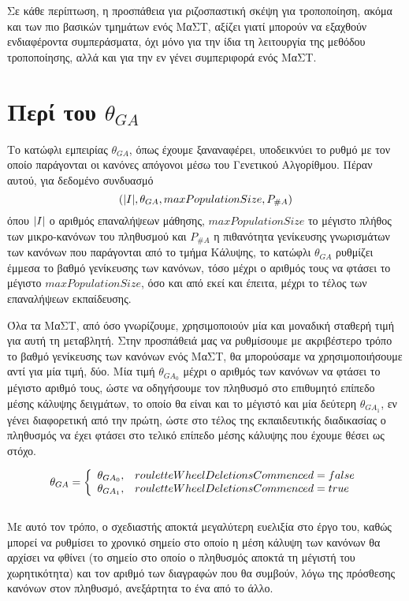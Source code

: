 Σε κάθε περίπτωση, η προσπάθεια για ριζοσπαστική σκέψη για τροποποίηση, ακόμα και των πιο βασικών τμημάτων ενός ΜαΣΤ, αξίζει γιατί μπορούν να εξαχθούν ενδιαφέροντα συμπεράσματα, όχι μόνο για την ίδια τη λειτουργία της μεθόδου τροποποίησης, αλλά και για την εν γένει συμπεριφορά ενός ΜαΣΤ.


\section{Περί του $\theta_{GA}$}
Το κατώφλι εμπειρίας $\theta_{GA}$, όπως έχουμε ξαναναφέρει, υποδεικνύει το ρυθμό με τον οποίο παράγονται οι κανόνες απόγονοι μέσω του Γενετικού Αλγορίθμου. Πέραν αυτού, για δεδομένο συνδυασμό $$(\lvert I\rvert, \theta_{GA}, maxPopulationSize, P_{\#A})$$ όπου $\lvert I\rvert$ ο αριθμός επαναλήψεων μάθησης, $maxPopulationSize$ το μέγιστο πλήθος των μικρο-κανόνων του πληθυσμού και $P_{\#A}$ η πιθανότητα γενίκευσης γνωρισμάτων των κανόνων που παράγονται από το τμήμα Κάλυψης, το κατώφλι $\theta_{GA}$ ρυθμίζει έμμεσα το βαθμό γενίκευσης των κανόνων, τόσο μέχρι ο αριθμός τους να φτάσει το μέγιστο $maxPopulationSize$, όσο και από εκεί και έπειτα, μέχρι το τέλος των επαναλήψεων εκπαίδευσης.

Όλα τα ΜαΣΤ, από όσο γνωρίζουμε, χρησιμοποιούν μία και μοναδική σταθερή τιμή για αυτή τη μεταβλητή. Στην προσπάθειά μας να ρυθμίσουμε με ακριβέστερο τρόπο το βαθμό γενίκευσης των κανόνων ενός ΜαΣΤ, θα μπορούσαμε να χρησιμοποιήσουμε αντί για μία τιμή, δύο. Μία τιμή $\theta_{GA_{0}}$ μέχρι ο αριθμός των κανόνων να φτάσει το μέγιστο αριθμό τους, ώστε να οδηγήσουμε τον πληθυσμό στο επιθυμητό επίπεδο μέσης κάλυψης δειγμάτων, το οποίο θα είναι και το μέγιστό και μία δεύτερη $\theta_{GA_{1}}$, εν γένει διαφορετική από την πρώτη, ώστε στο τέλος της εκπαιδευτικής διαδικασίας ο πληθυσμός να έχει φτάσει στο τελικό επίπεδο μέσης κάλυψης που έχουμε θέσει ως στόχο.


\begin{equation}
\theta_{GA} = \left\{
\begin{array}{ c l }
	\displaystyle \theta_{GA_{0}}, & rouletteWheelDeletionsCommenced = false
	\\
	\displaystyle \theta_{GA_{1}}, & rouletteWheelDeletionsCommenced = true

\end{array}
\right.
\end{equation}
\\

Με αυτό τον τρόπο, ο σχεδιαστής αποκτά μεγαλύτερη ευελιξία στο έργο του, καθώς μπορεί να ρυθμίσει το χρονικό σημείο στο οποίο η μέση κάλυψη των κανόνων θα αρχίσει να φθίνει (το σημείο στο οποίο ο πληθυσμός αποκτά τη μέγιστή του χωρητικότητα) και τον αριθμό των διαγραφών που θα συμβούν, λόγω της πρόσθεσης κανόνων στον πληθυσμό, ανεξάρτητα το ένα από το άλλο.


